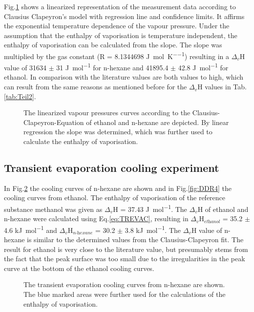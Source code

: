 \documentclass[a4paper,abstracton]{article}	                       %
\renewcommand{\cite}{\supercite}						%
\begin{document}
Fig.\ref{fig:DDR1} shows a linearized representation of the measurement data according to Clausius Clapeyron's model with regression line and confidence limits. It affirms the exponential temperature dependence of the vapour pressure. Under the assumption that the enthalpy of vaporisation is temperature independent, the enthalpy of vaporisation can be calculated from the slope. The slope was multiplied by the gas constant (R = 8.1344698 \si{\joule\per\mol\per\kelvin}) resulting in a $\Delta_{\textit{v}}$H value of 31634 $\pm$ 31 \si{\joule\per\mol} for n-hexane and  41895.4 $\pm$ 42.8 \si{\joule\per\mol} for ethanol. In comparison with the literature values are both values to high, which can result from the same reasons as mentioned before for the $\Delta_{\textit{v}}$H values in Tab.\ref{tab:Teil2}. 

\begin{figure}[H]
    \centering
    
    \caption{\label{fig:DDR1}The linearized vapour pressures curves according to the Clausius-Clapeyron-Equation of ethanol and n-hexane are depicted. By linear regression the slope was determined, which was further used to calculate the enthalpy of vaporisation.}
\end{figure}

\subsection*{Transient evaporation cooling experiment}

 In Fig.\ref{fig:DDR3} the cooling curves of n-hexane are shown and in Fig.\ref{fig:DDR4} the cooling curves from ethanol. The enthalpy of vaporisation of the reference substance methanol was given as $\Delta_{\textit{v}}$H = 37.43 \si{\joule\per\mol}\cite{meister}. The $\Delta_{\textit{v}}$H of ethanol and n-hexane were calculated using Eq.\ref{eq:TREVAC}, resulting in $\Delta_{\textit{v}}$H$_{\textit{ethanol}}$ = 35.2 $\pm$ 4.6 \si{\kilo\joule\per\mol} and $\Delta_{\textit{v}}$H$_{\textit{n-hexane}}$ = 30.2 $\pm$ 3.8 \si{\kilo\joule\per\mol}. The $\Delta_{\textit{v}}$H value of n-hexane is similar to the determined values from the Clausius-Clapeyron fit. The result for ethanol is very close to the literature value, but presumably stems from the fact that the peak surface was too small due to the irregularities in the peak curve at the bottom of the ethanol cooling curves. 
 
\begin{figure}[H]
    \centering
    
    \caption{\label{fig:DDR3}The transient evaporation cooling curves from n-hexane are shown. The blue marked areas were further used for the calculations of the enthalpy of vaporisation.}
\end{figure}
\end{document}
